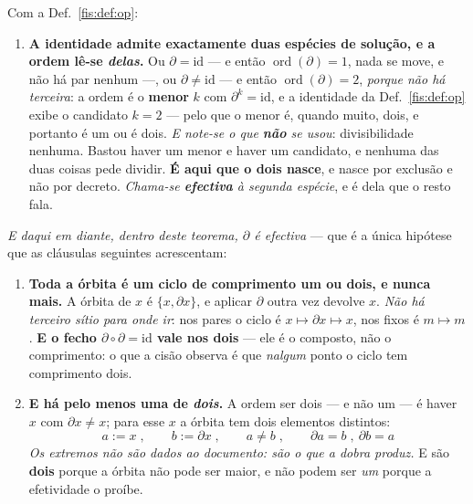 \documentclass[livro.tex]{subfiles}
\begin{document}
\begin{teorema}\label{fis:thm:doispontos}
Com a Def.~\ref{fis:def:op}:
\begin{enumerate}\itemsep3pt
\item[(0)] \textbf{A identidade admite exactamente duas espécies de solução, e a
ordem lê-se \emph{delas}.} Ou $\partial=\mathrm{id}$ --- e então
$\operatorname{ord}(\partial)=1$, nada se move, e não há par nenhum ---, ou
$\partial\neq\mathrm{id}$ --- e então $\operatorname{ord}(\partial)=2$,
\emph{porque não há terceira}: a ordem é o \textbf{menor} $k$ com
$\partial^{k}=\mathrm{id}$, e a identidade da Def.~\ref{fis:def:op} exibe o
candidato $k=2$ --- pelo que o menor é, quando muito, dois, e portanto é um ou é
dois. \emph{E note-se o que \textbf{não} se usou}: divisibilidade nenhuma.
Bastou haver um menor e haver um candidato, e nenhuma das duas coisas pede
dividir. \textbf{É aqui que o dois nasce}, e nasce por
exclusão e não por decreto. \emph{Chama-se \textbf{efectiva} à segunda espécie},
e é dela que o resto fala.
\end{enumerate}
\emph{E daqui em diante, dentro deste teorema, $\partial$ é efectiva} --- que é a
única hipótese que as cláusulas seguintes acrescentam:
\begin{enumerate}\itemsep3pt
\item[(1)] \textbf{Toda a órbita é um ciclo de comprimento um ou dois, e nunca
mais.} A órbita de $x$ é $\{x,\partial x\}$, e aplicar $\partial$ outra vez
devolve $x$. \emph{Não há terceiro sítio para onde ir}: nos pares o ciclo é
$x\mapsto\partial x\mapsto x$, nos fixos é $m\mapsto m$. \textbf{E o fecho
$\partial\circ\partial=\mathrm{id}$ vale nos dois} --- ele é o composto, não o
comprimento: o que a cisão observa é que \emph{nalgum} ponto o ciclo tem
comprimento dois.
\item[(2)] \textbf{E há pelo menos uma de \emph{dois}.} A ordem ser dois --- e não
um --- é haver $x$ com $\partial x\neq x$; para esse $x$ a órbita tem dois
elementos distintos:
\[
\boxed{\;a:=x\;,\qquad b:=\partial x\;,\qquad a\neq b\;,\qquad \partial a=b\;,\ \partial b=a\;}
\]
\emph{Os extremos não são dados ao documento: são o que a dobra produz.} E são
\textbf{dois} porque a órbita não pode ser maior, e não podem ser \emph{um}
porque a efetividade o proíbe.


\end{enumerate}
\end{teorema}
\end{document}
